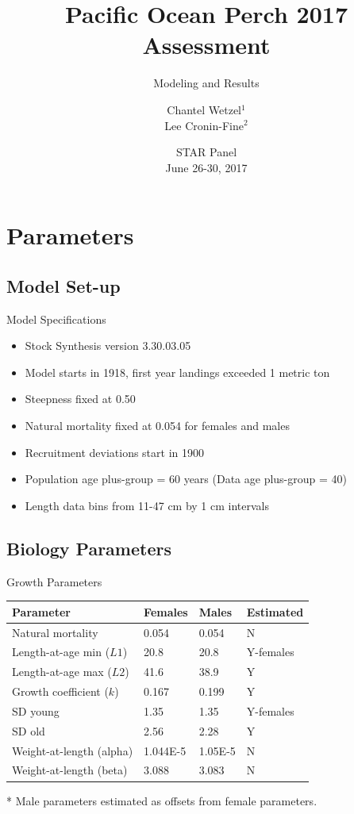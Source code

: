 \documentclass[pdf]{beamer}\usepackage[]{graphicx}\usepackage[]{color}
\title{Pacific Ocean Perch 2017 Assessment}
\subtitle{Modeling and Results}
\author{Chantel Wetzel$^{1}$\\
        Lee Cronin-Fine$^{2}$}
\institute[NWFSC]{
Northwest Fisheries Science Center$^1$ \\
University of Washington$^2$ \\
\medskip
}
\date{{\footnotesize STAR Panel \\ June 26-30, 2017}}
\begin{document}
\begin{frame}
  \titlepage
\end{frame}


\section{Parameters}
\subsection{Model Set-up}
\begin{frame}{Model Specifications}
  \begin{itemize}
    \item Stock Synthesis version 3.30.03.05
    \item Model starts in 1918, first year landings exceeded 1 metric ton
    \item Steepness fixed at 0.50
    \item Natural mortality fixed at 0.054 for females and males
    \item Recruitment deviations start in 1900
    \item Population age plus-group = 60 years (Data age plus-group = 40)
    \item Length data bins from 11-47 cm by 1 cm intervals
  \end{itemize}
\end{frame}

\subsection{Biology Parameters}
\begin{frame}{Growth Parameters}
  \begin{table}[ht]
  \small
  \centering
  \begin{tabular}{p{1.5in}p{0.65in}p{0.5in}p{0.75in}}
  Parameter & Females & Males & Estimated  \\ 
  \hline
  Natural mortality  & 0.054 & 0.054 & N \\
  Length-at-age min ($L1$) & 20.8  & 20.8 & Y-females \\
  Length-at-age max ($L2$) & 41.6  & 38.9 & Y \\
  Growth coefficient ($k$) & 0.167 & 0.199 & Y \\
  SD young & 1.35 & 1.35 & Y-females \\
  SD old   & 2.56 & 2.28 & Y \\
  Weight-at-length (alpha) & 1.044E-5 & 1.05E-5 & N \\
  Weight-at-length (beta)  & 3.088 & 3.083 & N \\
  \hline
  \end{tabular}
  \end{table}
  * Male parameters estimated as offsets from female parameters.
\end{frame}
\end{document}
